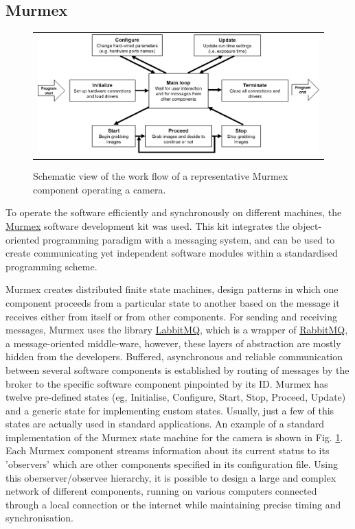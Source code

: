 \documentclass[12pt]{spieman}  %
\begin{document}
\begin{spacing}{2}
\subsection{Murmex}
\label{sec:murmex}
	\begin{figure}
   \begin{center}
   \begin{tabular}{c}
   \includegraphics[width=\textwidth]{SOI3.eps}
   \end{tabular}
   \end{center}
   \caption{\label{fig:murmex} Schematic view of the work flow of a representative Murmex component operating a camera.} 
   \end{figure}

To operate the software efficiently and synchronously on different machines, the \href{http://sine.ni.com/nips/cds/view/p/lang/en/nid/212895}{Murmex} software development kit was used. This kit integrates the object-oriented programming paradigm with a messaging system, and can be used to create communicating yet independent software modules within a standardised programming scheme.

Murmex creates distributed finite state machines, design patterns in which one component proceeds from a particular state to another based on the message it receives either from itself or from other components. For sending and receiving messages, Murmex uses the library \href{http://sine.ni.com/nips/cds/view/p/lang/en/nid/211065}{LabbitMQ}, which is a wrapper of \href{http://www.rabbitmq.com/}{RabbitMQ}, a message-oriented middle-ware, however, these layers of abstraction are mostly hidden from the developers. 
Buffered, asynchronous and reliable communication between several software components is established by routing of messages by the broker to the specific software component pinpointed by its ID.
Murmex has twelve pre-defined states (eg, Initialise, Configure, Start, Stop, Proceed, Update) and a generic state for implementing custom states. Usually, just a few of this states are actually used in standard applications. An example of a standard implementation of the Murmex state machine for the camera is shown in Fig. \ref{fig:murmex}. Each Murmex component streams information about its current status to its 'observers' which are other components specified in its configuration file. Using this oberserver/observee hierarchy, it is possible to design a large and complex network of different components, running on various computers connected through a local connection or the internet while maintaining precise timing and synchronisation.


\end{spacing}
\end{document}

